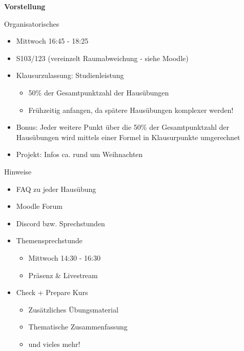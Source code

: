 \documentclass{../tuda-beamer}
\date{27. Oktober 2021}
\begin{document}
  \maketitle

  \begin{frame}[c]
    \begin{center}
      \textbf{\LARGE Vorstellung}
    \end{center}
  \end{frame}

  \begin{frame}{Organisatorisches}
    \begin{itemize}
      \item Mittwoch 16:45 - 18:25
      \item S103/123 (vereinzelt Raumabweichung - siehe Moodle)
      \item Klausurzulassung: Studienleistung
      \begin{itemize}
        \item 50\% der Gesamtpunktzahl der Hausübungen
        \item Frühzeitig anfangen, da spätere Hausübungen komplexer werden!
      \end{itemize}
      \item Bonus: Jeder weitere Punkt über die 50\% der Gesamtpunktzahl der Hausübungen wird
      mittels einer Formel in Klausurpunkte umgerechnet
      \item Projekt: Infos ca. rund um Weihnachten
    \end{itemize}
  \end{frame}

  \begin{frame}{Hinweise}
    \begin{itemize}
      \item FAQ zu jeder Hausübung
      \item Moodle Forum
      \item Discord bzw. Sprechstunden
      \item Themensprechstunde
      \begin{itemize}
        \item Mittwoch 14:30 - 16:30
        \item Präsenz \& Livestream
      \end{itemize}
      \item Check + Prepare Kurs
      \begin{itemize}
        \item Zusätzliches Übungsmaterial
        \item Thematische Zusammenfassung
        \item und vieles mehr!
      \end{itemize}
    \end{itemize}
  \end{frame}
\end{document}
